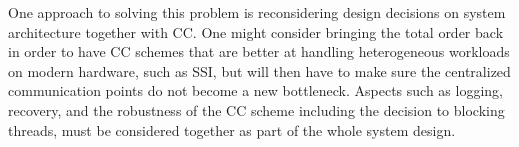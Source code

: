 \documentclass[preprint]{sig-alternate-nocprt}
\begin{document}
One approach to solving this problem is reconsidering design decisions on system architecture together with CC. One might consider bringing the total order back in order to have CC schemes that are better at handling heterogeneous workloads on modern hardware, such as SSI, but will then have to make sure the centralized communication points do not become a new bottleneck. Aspects such as logging, recovery, and the robustness of the CC scheme including the decision to blocking threads, must be considered together as part of the whole system design.



\end{document}
